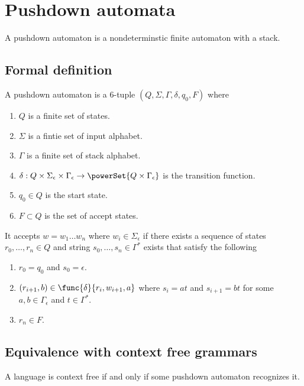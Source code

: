 \section{Pushdown automata}
A pushdown automaton is a nondeterminstic finite automaton with a stack. 
\subsection{Formal definition}
\begin{definition}
    A pushdown automaton is a 6-tuple \((Q,\Sigma,\Gamma, \delta, q_0,F)\) where 
    \begin{enumerate}
        \item \(Q\) is a finite set of states.
        \item \(\Sigma\) is a fintie set of input alphabet.
        \item \(\Gamma\) is a finite set of stack alphabet.
        \item \(\delta: Q \times \Sigma_{\epsilon} \times \Gamma_{\epsilon} \to \powerSet{Q \times \Gamma_{\epsilon}}\) is the transition function.
        \item \(q_0 \in Q\) is the start state.
        \item \(F \subset Q\) is the set of accept states.
    \end{enumerate}
\end{definition}

It accepts \(w = w_1 \dots w_n\) where \(w_i \in \Sigma_{\epsilon}\) if there exists a sequence of states \(r_0, \dots , r_n \in Q\) and string \(s_0, \dots , s_n \in \Gamma^{\ast}\) exists that satisfy the following 
\begin{enumerate}
    \item \(r_0 = q_0\) and \(s_0 = \epsilon\).
    \item \((r_{i+1},b) \in \func{\delta}{r_i, w_{i+1},a}\) where \(s_i = at\) and \(s_{i+1} = bt\) for some \(a,b \in \Gamma_{\epsilon}\) and \(t \in \Gamma^{\ast}\).
    \item \(r_n \in F\).
\end{enumerate}
\subsection{Equivalence with context free grammars}
\begin{theorem}
    A language is context free if and only if some pushdown automaton recognizes it.
\end{theorem}

